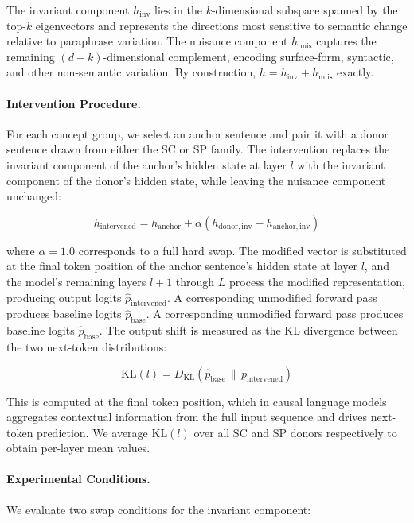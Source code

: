 The invariant component $h_{\mathrm{inv}}$ lies in the $k$-dimensional subspace spanned by the top-$k$ eigenvectors and represents the directions most sensitive to semantic change relative to paraphrase variation. The nuisance component $h_{\mathrm{nuis}}$ captures the remaining $(d - k)$-dimensional complement, encoding surface-form, syntactic, and other non-semantic variation. By construction, $h = h_{\mathrm{inv}} + h_{\mathrm{nuis}}$ exactly.

\paragraph{Intervention Procedure.}
For each concept group, we select an anchor sentence and pair it with a donor sentence drawn from either the SC or SP family. The intervention replaces the invariant component of the anchor's hidden state at layer $l$ with the invariant component of the donor's hidden state, while leaving the nuisance component unchanged:

\begin{equation}
    h_{\mathrm{intervened}} = h_{\mathrm{anchor}} + \alpha \left( h_{\mathrm{donor,inv}} - h_{\mathrm{anchor,inv}} \right)
\end{equation}

where $\alpha = 1.0$ corresponds to a full hard swap. The modified vector is substituted at the final token position of the anchor sentence's hidden state at layer $l$, and the model's remaining layers $l{+}1$ through $L$ process the modified representation, producing output logits $\hat{p}_{\mathrm{intervened}}$. A corresponding unmodified forward pass produces baseline logits $\hat{p}_{\mathrm{base}}$. A corresponding unmodified forward pass produces baseline logits $\hat{p}_{\mathrm{base}}$. The output shift is measured as the KL divergence between the two next-token distributions:


\begin{equation}
    \mathrm{KL}(l) = D_{\mathrm{KL}}\!\left(\hat{p}_{\mathrm{base}} \,\|\, \hat{p}_{\mathrm{intervened}}\right)
\end{equation}

This is computed at the final token position, which in causal language models aggregates contextual information from the full input sequence and drives next-token prediction. We average $\mathrm{KL}(l)$ over all SC and SP donors respectively to obtain per-layer mean values.

\paragraph{Experimental Conditions.}
We evaluate two swap conditions for the invariant component:


